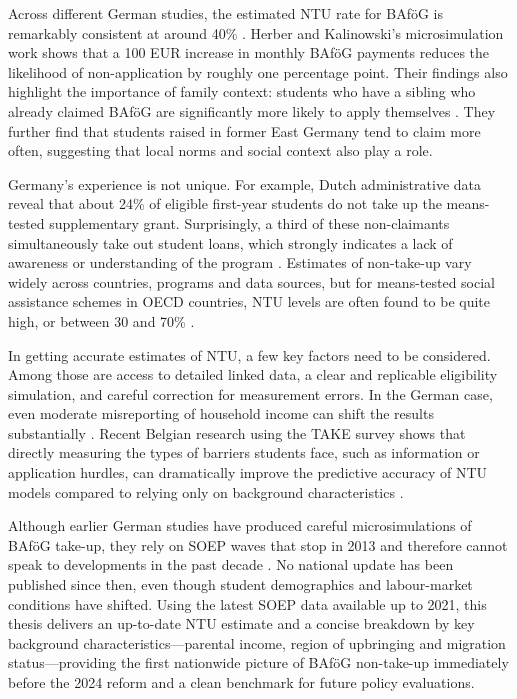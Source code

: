 Across different German studies, the estimated NTU rate for BAföG is remarkably consistent at around 40\% \citep{goedeme_concept_2020, mechelen_who_2017}. Herber and Kalinowski’s microsimulation work shows that a 100 EUR increase in monthly BAföG payments reduces the likelihood of non-application by roughly one percentage point. Their findings also highlight the importance of family context: students who have a sibling who already claimed BAföG are significantly more likely to apply themselves \citep{frick_claim_2007, bruckmeier_new_2012}. They further find that students raised in former East Germany tend to claim more often, suggesting that local norms and social context also play a role.

Germany’s experience is not unique. For example, Dutch administrative data reveal that about 24\% of eligible first-year students do not take up the means-tested supplementary grant. Surprisingly, a third of these non-claimants simultaneously take out student loans, which strongly indicates a lack of awareness or understanding of the program \citep{konijn_quantifying_2023}. Estimates of non-take-up vary widely across countries, programs and data sources, but for means-tested social assistance schemes in OECD countries, NTU levels are often found to be quite high, or between 30 and 70\% \citep{goedeme_concept_2020}.

In getting accurate estimates of NTU, a few key factors need to be considered. Among those are access to detailed linked data, a clear and replicable eligibility simulation, and careful correction for measurement errors. In the German case, even moderate misreporting of household income can shift the results substantially \citep{goedeme_concept_2020, frick_claim_2007}. Recent Belgian research using the TAKE survey shows that directly measuring the types of barriers students face, such as information or application hurdles, can dramatically improve the predictive accuracy of NTU models compared to relying only on background characteristics \citep{bolland_information_nodate}.

Although earlier German studies have produced careful microsimulations of BAföG take-up, they rely on SOEP waves that stop in 2013 and therefore cannot speak to developments in the past decade \citep{herber_non-take-up_2019, bruckmeier_new_2012}. No national update has been published since then, even though student demographics and labour-market conditions have shifted. Using the latest SOEP data available up to 2021, this thesis delivers an up-to-date NTU estimate and a concise breakdown by key background characteristics—parental income, region of upbringing and migration status—providing the first nationwide picture of BAföG non-take-up immediately before the 2024 reform and a clean benchmark for future policy evaluations.

